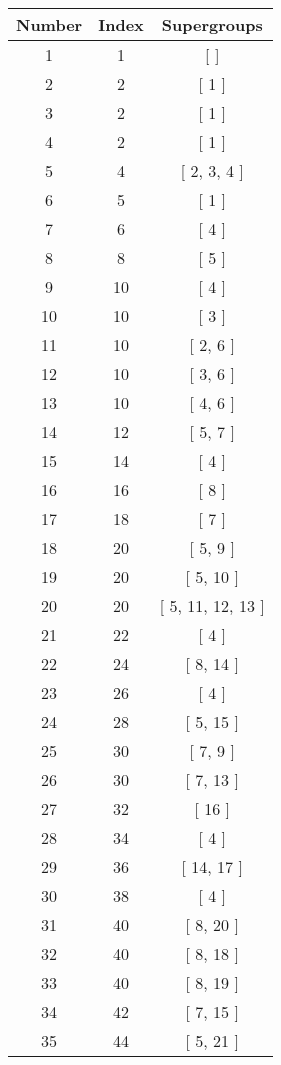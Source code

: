 \begin{center}
\begin{longtable}[H]{|| c c c ||}
\hline
Number & Index & Supergroups \\ 
\hline
1 & 1 & [ ] \\ 
\hline
2 & 2 & [ 1 ] \\ 
\hline
3 & 2 & [ 1 ] \\ 
\hline
4 & 2 & [ 1 ] \\ 
\hline
5 & 4 & [ 2, 3, 4 ] \\ 
\hline
6 & 5 & [ 1 ] \\ 
\hline
7 & 6 & [ 4 ] \\ 
\hline
8 & 8 & [ 5 ] \\ 
\hline
9 & 10 & [ 4 ] \\ 
\hline
10 & 10 & [ 3 ] \\ 
\hline
11 & 10 & [ 2, 6 ] \\ 
\hline
12 & 10 & [ 3, 6 ] \\ 
\hline
13 & 10 & [ 4, 6 ] \\ 
\hline
14 & 12 & [ 5, 7 ] \\ 
\hline
15 & 14 & [ 4 ] \\ 
\hline
16 & 16 & [ 8 ] \\ 
\hline
17 & 18 & [ 7 ] \\ 
\hline
18 & 20 & [ 5, 9 ] \\ 
\hline
19 & 20 & [ 5, 10 ] \\ 
\hline
20 & 20 & [ 5, 11, 12, 13 ] \\ 
\hline
21 & 22 & [ 4 ] \\ 
\hline
22 & 24 & [ 8, 14 ] \\ 
\hline
23 & 26 & [ 4 ] \\ 
\hline
24 & 28 & [ 5, 15 ] \\ 
\hline
25 & 30 & [ 7, 9 ] \\ 
\hline
26 & 30 & [ 7, 13 ] \\ 
\hline
27 & 32 & [ 16 ] \\ 
\hline
28 & 34 & [ 4 ] \\ 
\hline
29 & 36 & [ 14, 17 ] \\ 
\hline
30 & 38 & [ 4 ] \\ 
\hline
31 & 40 & [ 8, 20 ] \\ 
\hline
32 & 40 & [ 8, 18 ] \\ 
\hline
33 & 40 & [ 8, 19 ] \\ 
\hline
34 & 42 & [ 7, 15 ] \\ 
\hline
35 & 44 & [ 5, 21 ] \\ 

\end{longtable}
\end{center}
